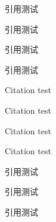 \documentclass[degree=doctor,fontset=fandol]{ustcthesis}
\begin{document}
\START
\showoutput

引用\cite{sunliguang2016jidi}测试\par
引用\cite[42]{sunliguang2016jidi}测试\par
引用\cite[见][]{liyongchi2016zhangliang}测试\par
引用\cite[见][42]{liujingshuang2014shidi}测试\par

Citation \cite{crawford1995future} test\par
Citation \cite[42]{crawford1995future} test\par
Citation \cite[see][]{ifla1977names} test\par
Citation \cite[see][42]{ifla1977names} test\par

引用\cite{sunliguang2016jidi}测试\par
引用\cite{liyongchi2016zhangliang,liujingshuang2014shidi}测试\par
引用\cite{crawford1995future,ifla1977names,chenggenwei1999hongshui}测试\par

\nocite{*}

\backmatter
\printbibliography

\clearpage
\OMIT
\end{document}

